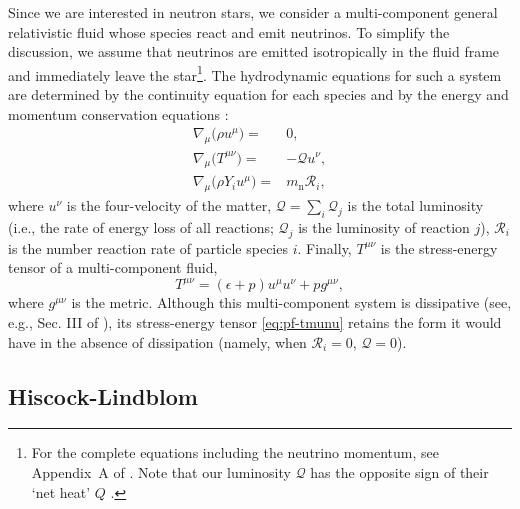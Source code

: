 \documentclass[aps,prd,twocolumn,a4paper,floatfix,nofootbib,superscriptaddress,nofootinbib]{revtex4}
\newcommand{\rn}{\mathrm{n}}
\begin{document}
Since we are interested in neutron stars, we consider a multi-component general
relativistic fluid whose species react and emit neutrinos. To simplify the
discussion, we assume that neutrinos are emitted isotropically in the fluid
frame and immediately leave the star\footnote{For the complete equations
including the neutrino momentum, see Appendix~A of \citet{OConnor10}.
Note that our luminosity $\mathcal Q$ has the opposite sign of their `net heat' $Q$
\citep{OConnor10}.}.  The
hydrodynamic equations for such a system are determined by the continuity
equation for each species and by the energy and momentum conservation equations
\cite{OConnor10}:
%
\begin{align}
\label{eq:continuity}
\nabla_\mu \big( \rho u^\mu \big) ={}&0,\\
\label{eq:pf-conservation}
\nabla_\mu\big( T^{\mu \nu}\big)={}&-\mathcal Q u^\nu,\\
\label{eq:pf-chemical}
\nabla_\mu \big( \rho Y_i u^\mu \big)={}&m_\rn\mathcal R_i,
\end{align}
%
where $u^\nu$ is the four-velocity of the matter, $\mathcal Q=\sum_i\mathcal Q_j$ is the total
luminosity (i.e., the rate of energy loss of all reactions; $\mathcal Q_j$ is the luminosity
of reaction $j$), $\mathcal R_i$ is the number reaction rate of particle
species $i$.
Finally, $T^{\mu\nu}$ is the stress-energy tensor of a multi-component fluid,
%
\begin{equation}
\label{eq:pf-tmunu}
T^{\mu\nu}=(\epsilon + p)u^\mu u^\nu + pg^{\mu\nu},
\end{equation}
%
where $g^{\mu\nu}$ is the metric. Although this multi-component system is dissipative 
(see, e.g., Sec. III of \citep{Gavassino21bulk}), its stress-energy tensor \eqref{eq:pf-tmunu} retains 
the form it would have in the absence of dissipation 
(namely, when $\mathcal{R}_i=0$, $\mathcal Q =0$).

\subsection{Hiscock-Lindblom}
\label{ssec:is}
\end{document}
